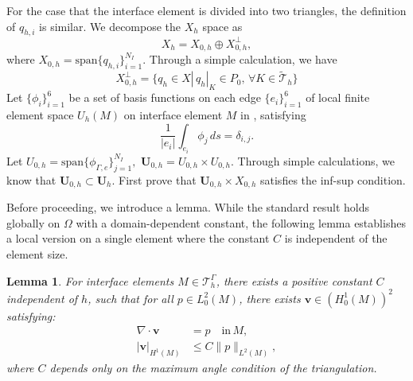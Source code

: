 \documentclass[a4paper,11pt,fleqn]{article}
\newtheorem{lemma}[theorem]{Lemma}
\numberwithin{equation}{section}
\begin{document}
For the case that the interface element is divided into two triangles, the definition of $q_{h,i}$ is similar. We decompose the $X_h$ space as
\begin{equation}
X_h=X_{0,h}\oplus X^\bot _{0,h},
\end{equation}
where $X_{0,h}= \mathrm{span}\{q_{h,i}\}^{N_I}_{i=1}$. Through a simple calculation, we have
\begin{equation}
	X^{\perp}_{0,h}=\{q_h\in X|\,q_h|_K\in P_0,\,\forall K\in \widetilde{\mathcal{T}}_h\}
\end{equation}
  Let $\{\phi_i\}^6_{i=1}$ be a set of basis functions on each edge $\{e_i\}^6_{i=1}$ of local finite element space $U_h(M)$ on interface element $M$ in 
, satisfying
$$\frac{1}{|e_i|}\int_{e_i}\phi_j\,ds =\delta_{i,j}.$$
Let $U_{0,h}=\mathrm{span}\{\phi_{\Gamma,e}\}^{N_I}_{j=1},$ $\boldsymbol{U}_{0,h}=U_{0,h}\times U_{0,h}.$ Through simple calculations, we know that $\boldsymbol{U}_{0,h}\subset \boldsymbol{U}_h.$ First prove that $\boldsymbol{U}_{0,h}\times X_{0,h}$ satisfies the inf-sup condition.



Before proceeding, we introduce a lemma. While the standard result holds globally on $\Omega$ with a domain-dependent constant, the following lemma establishes a local version on a single element where the constant $C$ is independent of the element size.
\begin{lemma}\label{le:div}
	For interface elements $M \in \mathcal{T}_h^{\Gamma}$, there exists a positive constant $C$ independent of $h$, such that for all $p \in L^2_0(M)$, there exists $\bm{v} \in (H^1_0(M))^2$ satisfying:
	\begin{align}
		\nabla \cdot \bm{v} &= p \quad \mathrm{in}\, M, \\
		|\bm{v}|_{H^1(M)} &\leq C \|p\|_{L^2(M)},
	\end{align}
	where $C$ depends only on the maximum angle condition of the triangulation.
\end{lemma}
\end{document}

